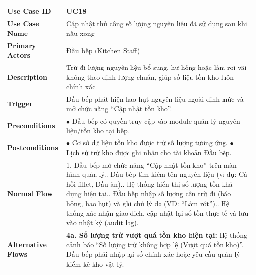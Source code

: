 \begin{longtable}{|L{3.5cm}|L{12.5cm}|}
\hline
\textbf{Use Case ID} & UC18 \\ \hline
\textbf{Use Case Name} & Cập nhật thủ công số lượng nguyên liệu đã sử dụng sau khi nấu xong \\ \hline
\textbf{Primary Actors} & Đầu bếp (Kitchen Staff) \\ \hline
\textbf{Description} & Trừ đi lượng nguyên liệu bổ sung, hư hỏng hoặc làm rơi vãi không theo định lượng chuẩn, giúp số liệu tồn kho luôn chính xác. \\ \hline
\textbf{Trigger} & Đầu bếp phát hiện hao hụt nguyên liệu ngoài định mức và mở chức năng ``Cập nhật tồn kho''. \\ \hline
\textbf{Preconditions} & $\bullet$ Đầu bếp có quyền truy cập vào module quản lý nguyên liệu/tồn kho tại bếp. \\ \hline
\textbf{Postconditions} &
$\bullet$ Cơ sở dữ liệu tồn kho được trừ số lượng tương ứng.\newline
$\bullet$ Lịch sử trừ kho được ghi nhận cho tài khoản Đầu bếp. \\ \hline
\textbf{Normal Flow} &
1. Đầu bếp mở chức năng ``Cập nhật tồn kho'' trên màn hình quản lý.. Đầu bếp tìm kiếm tên nguyên liệu (ví dụ: Cá hồi fillet, Dầu ăn).. Hệ thống hiển thị số lượng tồn khả dụng hiện tại.. Đầu bếp nhập số lượng cần trừ đi (báo hỏng, hao hụt) và ghi chú lý do (VD: ``Làm rớt'').. Hệ thống xác nhận giao dịch, cập nhật lại số tồn thực tế và lưu vào nhật ký (audit log). \\ \hline
\textbf{Alternative Flows} &
\textbf{4a. Số lượng trừ vượt quá tồn kho hiện tại:} Hệ thống cảnh báo ``Số lượng trừ không hợp lệ (Vượt quá tồn kho)''. Đầu bếp phải nhập lại số chính xác hoặc yêu cầu quản lý kiểm kê kho vật lý. \\ \hline
\end{longtable}

